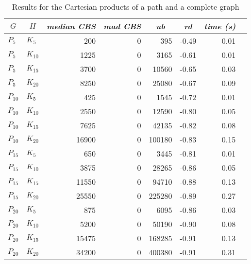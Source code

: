 \documentclass{scrartcl}
\theoremstyle{plain}
\newcommand{\cbs}{CBS}
\begin{document}
\begin{table}[!ht]
	\centering
	\scriptsize
	\begin{tabular}{|ll|rr|r|r|r|r|} 
	\hline
	\multicolumn{1}{|c}{$G$} &
	\multicolumn{1}{c|}{$H$} &
	\multicolumn{1}{c}{\emph{median \cbs{}}} &
	\multicolumn{1}{c|}{\emph{mad \cbs{}}} &
	\multicolumn{1}{c|}{\emph{ub}} &
	\multicolumn{1}{c|}{\emph{rd}} &
	\multicolumn{1}{c|}{\emph{time (s)}} \\ \hline
		
	\makeatletter{}$P_{5}$ & $K_{5}$ & 200 & 0 & 395 & -0.49 & 0.01 \\ 
$P_{5}$ & $K_{10}$ & 1225 & 0 & 3165 & -0.61 & 0.01 \\ 
$P_{5}$ & $K_{15}$ & 3700 & 0 & 10560 & -0.65 & 0.03 \\ 
$P_{5}$ & $K_{20}$ & 8250 & 0 & 25080 & -0.67 & 0.09 \\ 
$P_{10}$ & $K_{5}$ & 425 & 0 & 1545 & -0.72 & 0.01 \\ 
$P_{10}$ & $K_{10}$ & 2550 & 0 & 12590 & -0.80 & 0.05 \\ 
$P_{10}$ & $K_{15}$ & 7625 & 0 & 42135 & -0.82 & 0.08 \\ 
$P_{10}$ & $K_{20}$ & 16900 & 0 & 100180 & -0.83 & 0.15 \\ 
$P_{15}$ & $K_{5}$ & 650 & 0 & 3445 & -0.81 & 0.01 \\ 
$P_{15}$ & $K_{10}$ & 3875 & 0 & 28265 & -0.86 & 0.05 \\ 
$P_{15}$ & $K_{15}$ & 11550 & 0 & 94710 & -0.88 & 0.13 \\ 
$P_{15}$ & $K_{20}$ & 25550 & 0 & 225280 & -0.89 & 0.27 \\ 
$P_{20}$ & $K_{5}$ & 875 & 0 & 6095 & -0.86 & 0.03 \\ 
$P_{20}$ & $K_{10}$ & 5200 & 0 & 50190 & -0.90 & 0.08 \\ 
$P_{20}$ & $K_{15}$ & 15475 & 0 & 168285 & -0.91 & 0.13 \\ 
$P_{20}$ & $K_{20}$ & 34200 & 0 & 400380 & -0.91 & 0.31 \\ 
 
	
	\hline
	\end{tabular}
	\caption{\label{tab:cart_pk_perf}Results for the Cartesian products of a 
path and a complete graph}

\end{table}
\end{document}
